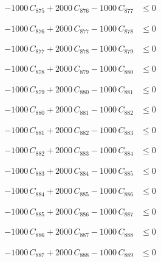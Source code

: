 \documentclass[a4paper,11pt]{article}
\begin{document}
\begin{align}
-1000\,C_{875} + 2000\,C_{876} - 1000\,C_{877} &\leq 0 \nonumber
\end{align}

\begin{align}
-1000\,C_{876} + 2000\,C_{877} - 1000\,C_{878} &\leq 0 \nonumber
\end{align}

\begin{align}
-1000\,C_{877} + 2000\,C_{878} - 1000\,C_{879} &\leq 0 \nonumber
\end{align}

\begin{align}
-1000\,C_{878} + 2000\,C_{879} - 1000\,C_{880} &\leq 0 \nonumber
\end{align}

\begin{align}
-1000\,C_{879} + 2000\,C_{880} - 1000\,C_{881} &\leq 0 \nonumber
\end{align}

\begin{align}
-1000\,C_{880} + 2000\,C_{881} - 1000\,C_{882} &\leq 0 \nonumber
\end{align}

\begin{align}
-1000\,C_{881} + 2000\,C_{882} - 1000\,C_{883} &\leq 0 \nonumber
\end{align}

\begin{align}
-1000\,C_{882} + 2000\,C_{883} - 1000\,C_{884} &\leq 0 \nonumber
\end{align}

\begin{align}
-1000\,C_{883} + 2000\,C_{884} - 1000\,C_{885} &\leq 0 \nonumber
\end{align}

\begin{align}
-1000\,C_{884} + 2000\,C_{885} - 1000\,C_{886} &\leq 0 \nonumber
\end{align}

\begin{align}
-1000\,C_{885} + 2000\,C_{886} - 1000\,C_{887} &\leq 0 \nonumber
\end{align}

\begin{align}
-1000\,C_{886} + 2000\,C_{887} - 1000\,C_{888} &\leq 0 \nonumber
\end{align}

\begin{align}
-1000\,C_{887} + 2000\,C_{888} - 1000\,C_{889} &\leq 0 \nonumber
\end{align}
\end{document}
